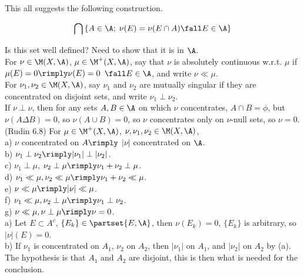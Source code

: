 \noindent
This all suggests the following construction.

$$
    \bigcap \left\{ A \in \A ; \; \nu(E) = \nu(E \cap A) \fall E \in \A  \right\}
$$

\noindent
Is this set well defined? Need to show that it is in $\A$. \\


For $\nu \in \M(X, \A)$, $\mu \in \M^+(X, \A)$, say that $\nu$ is absolutely continuous w.r.t. $\mu$ if $\mu(E) = 0 \rimply \nu(E) = 0$ $\fall E \in \A$, and write $\nu \ll \mu$. \\

For $\nu_1, \nu_2 \in \M(X, \A)$, say $\nu_1$ and $\nu_2$ are mutually singular if they are concentrated on disjoint sets, and write $\nu_1 \perp \nu_2$. \\

\noindent
If $\nu \perp \nu$, then for any sets $A,B \in \A$ on which $\nu$ concentrates, $A \cap B = \phi$, but $\nu(A \Delta B) = 0$, so $\nu(A \cup B) = 0$, so $\nu$ concentrates only on $\nu$-null sets, so $\nu=0$. \\


(Rudin 6.8) For $\mu \in \M^+(X, \A)$, $\nu,\nu_1,\nu_2 \in \M(X, \A)$, \\

\noindent
a) $\nu$ concentrated on $A \rimply$ $|\nu|$ concentrated on $\A$. \\
b) $\nu_1 \perp \nu_2 \rimply |\nu_1| \perp |\nu_2|$. \\
c) $\nu_1 \perp \mu$, $\nu_2 \perp \mu \rimply \nu_1 + \nu_2 \perp \mu$. \\
d) $\nu_1 \ll \mu, \nu_2 \ll \mu \rimply \nu_1 + \nu_2 \ll \mu$. \\
e) $\nu \ll \mu \rimply |\nu| \ll \mu$. \\
f) $\nu_1 \ll \mu, \nu_2 \perp \mu \rimply \nu_1 \perp \nu_2$. \\
g) $\nu \ll \mu, \nu \perp \mu \rimply \nu = 0$. \\

\noindent
a) Let $E \subset A^c$, $\{ E_k \} \in \partset{E, \A}$, then $\nu(E_k) = 0$, $\{E_k\}$ is arbitrary, so $|\nu|(E) = 0$. \\

\noindent
b) If $\nu_1$ is concentrated on $A_1$, $\nu_2$ on $A_2$, then $|\nu_1|$ on $A_1$, and $|\nu_2|$ on $A_2$ by (a). The hypothesis is that $A_1$ and $A_2$ are disjoint, this is then what is needed for the conclusion. \\

